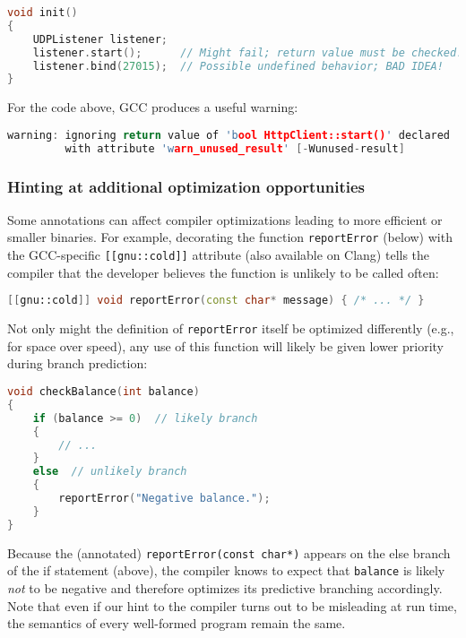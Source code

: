 \begin{lstlisting}[language=C++]
void init()
{
    UDPListener listener;
    listener.start();      // Might fail; return value must be checked!
    listener.bind(27015);  // Possible undefined behavior; BAD IDEA!
}
\end{lstlisting}
    
\noindent For the code above, GCC produces a useful warning:

\begin{lstlisting}[language=C++]
warning: ignoring return value of 'bool HttpClient::start()' declared
         with attribute 'warn_unused_result' [-Wunused-result]
\end{lstlisting}
    

\subsubsection[Hinting at additional optimization opportunities]{Hinting at additional optimization opportunities}\label{hinting-at-additional-optimization-opportunities}

Some annotations can affect compiler optimizations leading to more
efficient or smaller binaries. For example, decorating the function
\texttt{reportError} (below) with the GCC-specific
\texttt{[[gnu::cold]]} attribute (also available on Clang) tells the
compiler that the developer believes the function is unlikely to be
called often:

\begin{lstlisting}[language=C++]
[[gnu::cold]] void reportError(const char* message) { /* ... */ }
\end{lstlisting}
    
\noindent Not only might the definition of \texttt{reportError} itself be
optimized differently (e.g., for space over speed), any use of this
function will likely be given lower priority during branch \mbox{prediction}:

\begin{lstlisting}[language=C++]
void checkBalance(int balance)
{
    if (balance >= 0)  // likely branch
    {
        // ...
    }
    else  // unlikely branch
    {
        reportError("Negative balance.");
    }
}
\end{lstlisting}
    
\noindent Because the (annotated) \texttt{reportError(const}~\texttt{char*)}
appears on the else branch of the if statement (above), the compiler
knows to expect that \texttt{balance} is likely \emph{not} to be
negative and therefore optimizes its predictive branching accordingly.
Note that even if our hint to the compiler turns out to be misleading at
run time, the semantics of every well-formed program remain the same.

